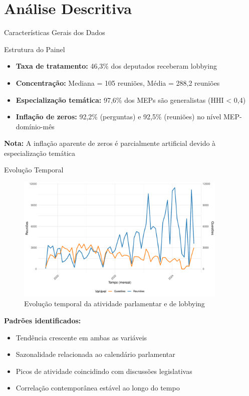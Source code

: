 \documentclass[aspectratio=169]{beamer}
\begin{document}

\section{Análise Descritiva}

\begin{frame}{Características Gerais dos Dados}
\begin{block}{Estrutura do Painel}
\begin{itemize}
\item \textbf{Taxa de tratamento:} 46,3\% dos deputados receberam lobbying
\item \textbf{Concentração:} Mediana = 105 reuniões, Média = 288,2 reuniões
\item \textbf{Especialização temática:} 97,6\% dos MEPs são generalistas (HHI < 0,4)
\item \textbf{Inflação de zeros:} 92,2\% (perguntas) e 92,5\% (reuniões) no nível MEP-domínio-mês
\end{itemize}
\end{block}

\vspace{0.3cm}

\textbf{Nota:} A inflação aparente de zeros é parcialmente artificial devido à especialização temática
\end{frame}

\begin{frame}{Evolução Temporal}
\begin{figure}
\centering
\includegraphics[width=0.9\textwidth]{figures/fig1_time_series_meetings_questions.pdf}
\caption{Evolução temporal da atividade parlamentar e de lobbying}
\end{figure}

\textbf{Padrões identificados:}
\begin{itemize}
\item Tendência crescente em ambas as variáveis
\item Sazonalidade relacionada ao calendário parlamentar
\item Picos de atividade coincidindo com discussões legislativas
\item Correlação contemporânea estável ao longo do tempo
\end{itemize}
\end{frame}
\end{document}
